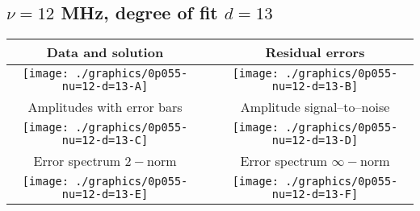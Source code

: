 

% 

\clearpage{}
\break{}

\subsection{$\nu = 12$ MHz, degree of fit $d = 13$}

\begin{table}[h]
    \begin{center}
        \begin{tabular}{ccc}
            Data and solution & \quad & Residual errors \\\hline
            \texttt{[image: ./graphics/0p055-nu=12-d=13-A]} &&
            \texttt{[image: ./graphics/0p055-nu=12-d=13-B]} \\[15pt]
            Amplitudes with error bars && Amplitude signal--to--noise \\\hline
            \texttt{[image: ./graphics/0p055-nu=12-d=13-C]} &&
            \texttt{[image: ./graphics/0p055-nu=12-d=13-D]} \\[15pt]
            Error spectrum $2-$norm && Error spectrum $\infty-$norm \\\hline
            \texttt{[image: ./graphics/0p055-nu=12-d=13-E]} &&
            \texttt{[image: ./graphics/0p055-nu=12-d=13-F]} \\[15pt]
        \end{tabular}
    \end{center}
\label{fig:elev=55, nu=12}
\end{table}



\endinput
